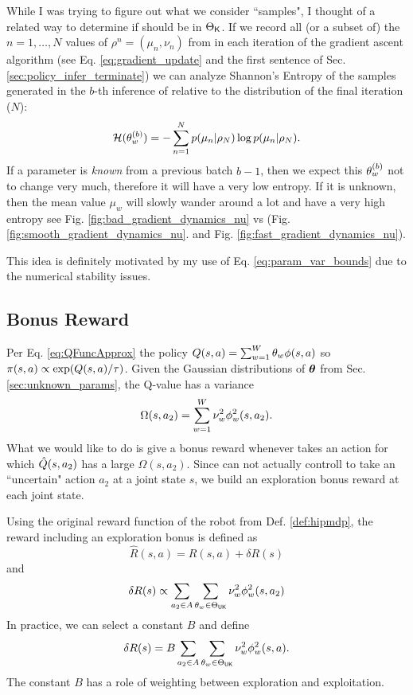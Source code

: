    \color{blue}
    While I was trying to figure out what we consider ``samples", I thought of a related way to determine if \paramElem
    should be in $\Theta_{\mathsf{K}}$. If we record all (or a subset of) the $n=1,\ldots,N$ values of $\rho^n = (\mu_n,
    \nu_n)$ from in each iteration of the gradient ascent algorithm (see Eq. \ref{eq:gradient_update} and the first
    sentence of Sec. \ref{sec:policy_infer_terminate}) we can analyze Shannon's Entropy of the samples generated in the
    $b$-th inference of  relative to the distribution of the final iteration ($N$):
    \[
    \mathcal{H}(\theta_{w}^{(b)}) = - \sum_{n=1}^{N} p(\mu_n| \rho_N)\log p(\mu_n|\rho_N).
    \]
    If a parameter is \emph{known} from a previous batch $b-1$, then we expect this $\theta_{w}^{(b)}$ not to change
    very much, therefore it will have a very low entropy. If it is unknown, then the mean value $\mu_w$ will slowly
    wander around a lot and have a very high entropy see Fig. \ref{fig:bad_gradient_dynamics_nu} vs (Fig.
    \ref{fig:smooth_gradient_dynamics_nu}.  and Fig. \ref{fig:fast_gradient_dynamics_nu}).

    \par
    This idea is definitely motivated by my use of Eq. \ref{eq:param_var_bounds} due to the numerical stability issues.
    \color{black}


\subsection{Bonus Reward}

    Per Eq. \ref{eq:QFuncApprox} the policy $Q(s,a) = \sum_{w=1}^{W} \theta_w \phi(s,a)$ so $\pi(s,a)\propto
    \exp(Q(s,a)/\tau)$. Given the Gaussian distributions of $\boldsymbol{\mathbb{\theta}}$ from Sec. \ref{sec:unknown_params}, the Q-value
    has a variance
    \[
    \Omega(s,a_2)=\sum_{w=1}^{W} \nu_w^2 \phi_w^2(s,a_2).
    \]
    What we would like to do is give  a bonus reward whenever  takes an action for which
    $\hat{Q}(s,a_2)$ has a large $\Omega(s,a_2)$. Since  can not actually controll  to take an
    ``uncertain" action $a_2$ at a joint state $s$, we build an exploration bonus reward at each joint state.

    Using the original reward function of the robot from Def. \ref{def:hipmdp}, the reward including an exploration
    bonus is defined as
    \[
    \hat R (s,a) = R(s,a) + \delta R(s)
    \]
    and
    \[\delta R(s)  \propto \sum_{a_2\in A}\sum_{\theta_w\in \Theta_{\mathsf{UK}}} \nu_w^2 \phi^2_w(s,a_2)
    \]
    In practice, we can select a constant $B$ and define
    \[
    \delta R(s) = B \sum_{a_2\in A}\sum_{\theta_w\in \Theta_{\mathsf{UK}}} \nu_w^2 \phi_w^2(s,a).
    \]
    The constant $B$ has a role of weighting between exploration and exploitation.

